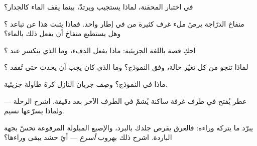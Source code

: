 \begin{exercise}[$\star$]\label{exo:g7:states-of-matter:3}
في اختبار المحقنة، لماذا يستجيب  ويرتدّ، بينما يقف الماء
كالجدار؟
\end{exercise}

\begin{exercise}[$\star$]\label{exo:g7:states-of-matter:4}
منفاخ الدرّاجة يرصّ ملء غرف كثيرة من  في إطار واحد. فماذا
يثبت هذا عن تباعد  ؟ وهل يستطيع منفاخ أن يفعل ذلك
بالماء؟
\end{exercise}

\begin{exercise}[$\star$]\label{exo:g7:states-of-matter:5}
احكِ قصة  باللغة الجزيئية: ماذا يفعل الدفء، وما الذي
ينكسر عند ؟
\end{exercise}

\begin{exercise}[$\star$]\label{exo:g7:states-of-matter:6}
لماذا تنجو  من كل تغيّر حالة، وفق النموذج؟ وما الذي كان
يجب أن يحدث  حتى تُفقد ؟
\end{exercise}

\begin{exercise}[$\star$]\label{exo:g7:states-of-matter:7}
ماذا   في النموذج؟ وصِف جريان  النازل
كرةَ طاولة جزيئية.
\end{exercise}

\begin{exercise}[$\star$]\label{exo:g7:states-of-matter:8}
عطر يُفتح في طرف غرفة ساكنة يُشمّ في الطرف الآخر بعد دقيقة.
اشرح الرحلة --- ولماذا يسرّعها نسيم.
\end{exercise}

\begin{exercise}[$\star\star$]\label{exo:g7:states-of-matter:9}
 يبرّد ما يتركه وراءه: فالعرق يقرص جلدك بالبرد، والإصبع
المبلولة المرفوعة تحسّ بجهة  الباردة. اشرح ذلك بهروب
\emph{أسرع}  --- أيّ حشد يبقى وراءها؟
\end{exercise}

